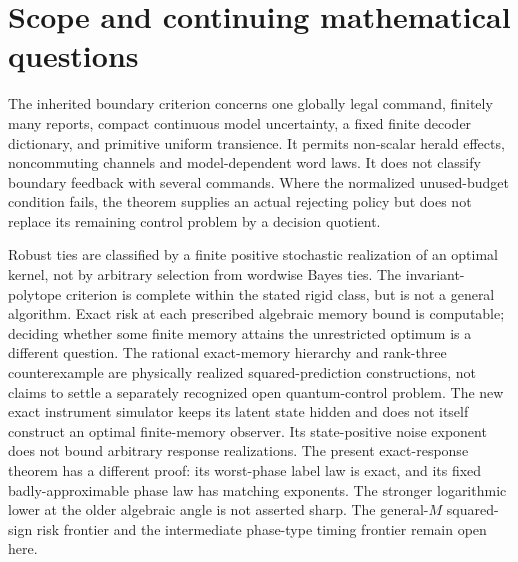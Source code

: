 \section{Scope and continuing mathematical questions}\label{sec:r70-scope}
The inherited boundary criterion concerns one globally legal command, finitely many reports, compact continuous model uncertainty, a fixed finite decoder dictionary, and primitive uniform transience. It permits non-scalar herald effects, noncommuting channels and model-dependent word laws. It does not classify boundary feedback with several commands. Where the normalized unused-budget condition fails, the theorem supplies an actual rejecting policy but does not replace its remaining control problem by a decision quotient.

Robust ties are classified by a finite positive stochastic realization of an optimal kernel, not by arbitrary selection from wordwise Bayes ties. The invariant-polytope criterion is complete within the stated rigid class, but is not a general algorithm. Exact risk at each prescribed algebraic memory bound is computable; deciding whether some finite memory attains the unrestricted optimum is a different question. The rational exact-memory hierarchy and rank-three counterexample are physically realized squared-prediction constructions, not claims to settle a separately recognized open quantum-control problem. The new exact instrument simulator keeps its latent state hidden and does not itself construct an optimal finite-memory observer. Its state-positive noise exponent does not bound arbitrary response realizations. The present exact-response theorem has a different proof: its worst-phase label law is exact, and its fixed badly-approximable phase law has matching exponents. The stronger logarithmic lower at the older algebraic angle is not asserted sharp. The general-$M$ squared-sign risk frontier and the intermediate phase-type timing frontier remain open here.

